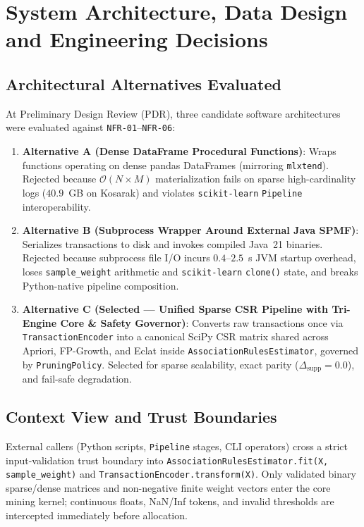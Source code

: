 
\chapter{System Architecture, Data Design and Engineering Decisions}

\section{Architectural Alternatives Evaluated}
At Preliminary Design Review (PDR), three candidate software architectures were evaluated against \texttt{NFR-01}--\texttt{NFR-06}:
\begin{enumerate}
  \item \textbf{Alternative A (Dense DataFrame Procedural Functions)}: Wraps functions operating on dense pandas DataFrames (mirroring \texttt{mlxtend}). Rejected because $\mathcal{O}(N \times M)$ materialization fails on sparse high-cardinality logs ($40.9$~GB on Kosarak) and violates \texttt{scikit-learn} \texttt{Pipeline} interoperability.
  \item \textbf{Alternative B (Subprocess Wrapper Around External Java SPMF)}: Serializes transactions to disk and invokes compiled Java~21 binaries. Rejected because subprocess file I/O incurs $0.4$--$2.5$~s JVM startup overhead, loses \texttt{sample\_\protect\allowbreak{}weight} arithmetic and \texttt{scikit-learn} \texttt{clone()} state, and breaks Python-native pipeline composition.
  \item \textbf{Alternative C (Selected --- Unified Sparse CSR Pipeline with Tri-Engine Core \& Safety Governor)}: Converts raw transactions once via \texttt{TransactionEncoder} into a canonical SciPy CSR matrix shared across Apriori, FP-Growth, and Eclat inside \texttt{Association\protect\allowbreak{}Rules\protect\allowbreak{}Estimator}, governed by \texttt{PruningPolicy}. Selected for sparse scalability, exact parity ($\Delta_{\mathrm{supp}}=0.0$), and fail-safe degradation.
\end{enumerate}

\section{Context View and Trust Boundaries}
External callers (Python scripts, \texttt{Pipeline} stages, CLI operators) cross a strict input-validation trust boundary into \texttt{Association\protect\allowbreak{}Rules\protect\allowbreak{}Estimator.fit(X, sample\_\protect\allowbreak{}weight)} and \texttt{TransactionEncoder.transform(X)}. Only validated binary sparse/dense matrices and non-negative finite weight vectors enter the core mining kernel; continuous floats, NaN/Inf tokens, and invalid thresholds are intercepted immediately before allocation.


